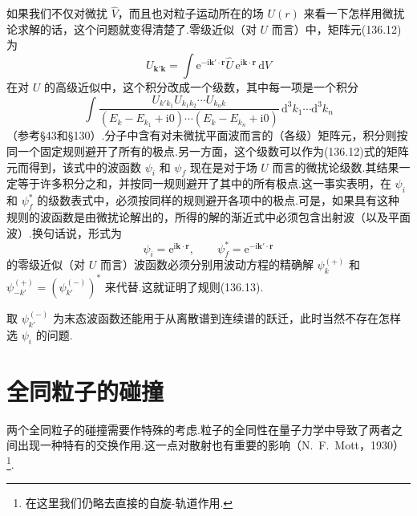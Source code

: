 如果我们不仅对微扰 $\hat{V}$，而且也对粒子运动所在的场 $U(r)$ 来看一下怎样用微扰论求解的话，这个问题就变得清楚了.零级近似（对 $U$ 而言）中，矩阵元(136.12)为
\begin{equation*}
  U_{\boldsymbol{k}'\boldsymbol{k}}
  =\int\mathrm{e}^{-\mathrm{i}\boldsymbol{k}'\cdot\boldsymbol{r}}
  \hat{U}\,\mathrm{e}^{\mathrm{i}\boldsymbol{k}\cdot\boldsymbol{r}}\,
  \mathrm{d}V
\end{equation*}
在对 $U$ 的高级近似中，这个积分改成一个级数，其中每一项是一个积分
\begin{equation*}
  \int\frac{U_{k'k_1}U_{k_1k_2}\cdots U_{k_nk}}
  {(E_k-E_{k_1}+\mathrm{i}0)\cdots(E_k-E_{k_n}+\mathrm{i}0)}\,
  \mathrm{d}^3k_1\cdots\mathrm{d}^3k_n
\end{equation*}
（参考§43和§130）.分子中含有对未微扰平面波而言的（各级）矩阵元，积分则按同一个固定规则避开了所有的极点.另一方面，这个级数可以作为(136.12)式的矩阵元而得到，该式中的波函数 $\psi_i$ 和 $\psi_f$ 现在是对于场 $U$ 而言的微扰论级数.其结果一定等于许多积分之和，并按同一规则避开了其中的所有极点.这一事实表明，在 $\psi_i$ 和 $\psi_f^{*}$ 的级数表式中，必须按同样的规则避开各项中的极点.可是，如果具有这种规则的波函数是由微扰论解出的，所得的解的渐近式中必须包含出射波（以及平面波）.换句话说，形式为
\begin{equation*}
  \psi_i=\mathrm{e}^{\mathrm{i}\boldsymbol{k}\cdot\boldsymbol{r}},
  \qquad
  \psi_f^{*}=\mathrm{e}^{-\mathrm{i}\boldsymbol{k}'\cdot\boldsymbol{r}}
\end{equation*}
的零级近似（对 $U$ 而言）波函数必须分别用波动方程的精确解
$\psi_{k}^{(+)}$ 和 $\psi_{-k'}^{(+)}=(\psi_{k'}^{(-)})^{*}$ 来代替.这就证明了规则(136.13).

取 $\psi_{k'}^{(-)}$ 为末态波函数还能用于从离散谱到连续谱的跃迁，此时当然不存在怎样选 $\psi_i$ 的问题.

\section{全同粒子的碰撞}

两个全同粒子的碰撞需要作特殊的考虑.粒子的全同性在量子力学中导致了两者之间出现一种特有的交换作用.这一点对散射也有重要的影响（N.~F.~Mott，1930）\footnote{在这里我们仍略去直接的自旋-轨道作用.}.

